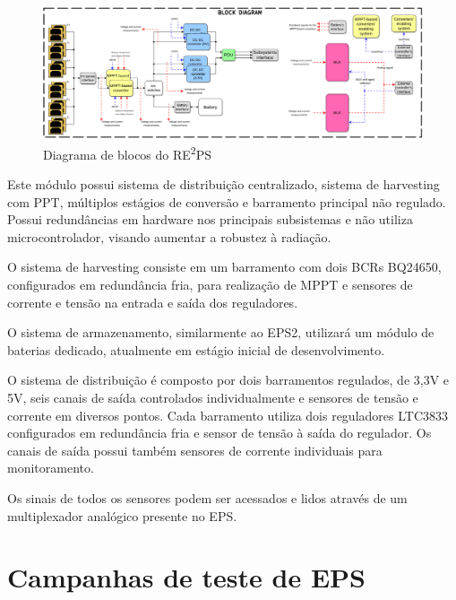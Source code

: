 \begin{figure}[htp]
    \caption{Diagrama de blocos do RE\textsuperscript{2}PS}
    \begin{center}
        \includegraphics[width=\textwidth, keepaspectratio]{images/reeps-block-diagram.png}
    \end{center}
    \label{fig:reeps-diagrama-blocos}
\end{figure}

Este módulo possui sistema de distribuição centralizado, sistema de harvesting com \gls{PPT}, múltiplos estágios de conversão e barramento principal não regulado.
Possui redundâncias em hardware nos principais subsistemas e não utiliza microcontrolador, visando aumentar a robustez à radiação.

O sistema de harvesting consiste em um barramento com dois \gls{BCR}s BQ24650, configurados em redundância fria, para realização de \gls{MPPT} e sensores de corrente e tensão na entrada e saída dos reguladores.

O sistema de armazenamento, similarmente ao \gls{EPS2}, utilizará um módulo de baterias dedicado, atualmente em estágio inicial de desenvolvimento.

O sistema de distribuição é composto por dois barramentos regulados, de 3,3V e 5V, seis canais de saída controlados individualmente e sensores de tensão e corrente em diversos pontos.
Cada barramento utiliza dois reguladores LTC3833 configurados em redundância fria e sensor de tensão à saída do regulador. Os canais de saída possui também sensores de corrente individuais para monitoramento.

Os sinais de todos os sensores podem ser acessados e lidos através de um multiplexador analógico presente no \gls{EPS}.





\section{Campanhas de teste de EPS}\label{sec:testes-epss}

